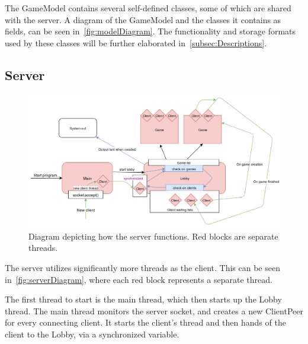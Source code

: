 \documentclass[12pt, letterpaper]{article}
\begin{document}
    The GameModel contains several self-defined classes, some of which are shared with the server.
    A diagram of the GameModel and the classes it contains as fields, can be seen in~\autoref{fig:modelDiagram}.
    The functionality and storage formats used by these classes
    will be further elaborated in~\autoref{subsec:Descriptions}.



    \subsection{Server}

    \begin{figure}[ht]
        \begin{center}
            \includegraphics[width=\textwidth]{Server.png}
            \caption{Diagram depicting how the server functions.
            Red blocks are separate threads.}
            \label{fig:serverDiagram}
        \end{center}
    \end{figure}

    The server utilizes significantly more threads as the client.
    This can be seen in~\autoref{fig:serverDiagram}, where each red block represents a separate thread.

    The first thread to start is the main thread, which then starts up the Lobby thread.
    The main thread monitors the server socket, and creates a new ClientPeer for every connecting client.
    It starts the client's thread and then hands of the client to the Lobby, via a synchronized variable.
\end{document}
